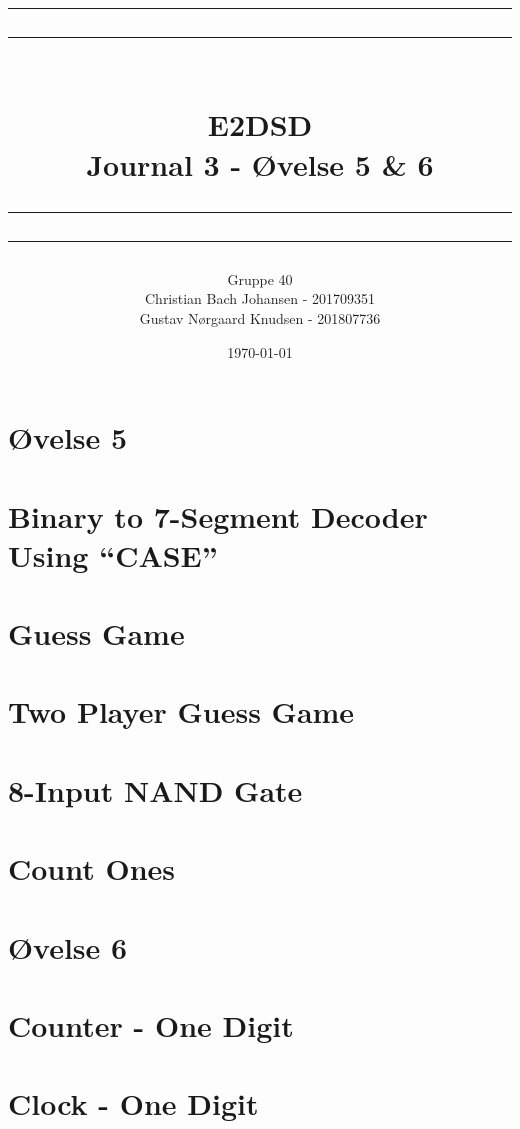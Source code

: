 \documentclass[12pt,a4paper]{article}
\newcommand\mymaketitle[1]{
   \rule{\textwidth}{1.6pt}\vspace*{-\baselineskip}\vspace*{2pt}
   \rule{\textwidth}{0.4pt}
   \\  
   \huge \bf #1\\
   \vspace{-8pt}
   \rule{\textwidth}{0.4pt}\vspace*{-\baselineskip}\vspace{3.2pt}
   \rule{\textwidth}{1.6pt}
}
\begin{document}
\title{
	\mymaketitle{E2DSD\\Journal 3 - Øvelse 5 \& 6}
}
\author{
	Gruppe 40\\
	Christian Bach Johansen - 201709351\\
	Gustav Nørgaard Knudsen - 201807736
}
\date{\today}

\maketitle

\section*{Øvelse 5}

\section{Binary to 7-Segment Decoder Using “CASE”}


\section{Guess Game}


\section{Two Player Guess Game}


\section{8-Input NAND Gate}


\section{Count Ones}


\section*{Øvelse 6}

\section{Counter - One Digit}


\section{Clock - One Digit}

\end{document}
